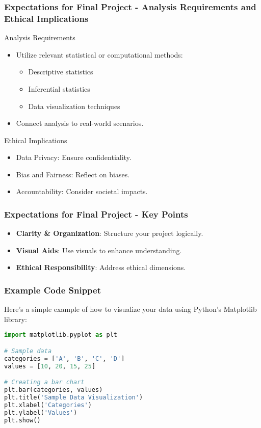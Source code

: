 \documentclass[aspectratio=169]{beamer}
\begin{document}
\begin{frame}[fragile]
    \frametitle{Expectations for Final Project - Analysis Requirements and Ethical Implications}
    \begin{block}{Analysis Requirements}
        \begin{itemize}
            \item Utilize relevant statistical or computational methods:
            \begin{itemize}
                \item Descriptive statistics
                \item Inferential statistics
                \item Data visualization techniques
            \end{itemize}
            \item Connect analysis to real-world scenarios.
        \end{itemize}
    \end{block}
    
    \begin{block}{Ethical Implications}
        \begin{itemize}
            \item Data Privacy: Ensure confidentiality.
            \item Bias and Fairness: Reflect on biases.
            \item Accountability: Consider societal impacts.
        \end{itemize}
    \end{block}
\end{frame}

\begin{frame}[fragile]
    \frametitle{Expectations for Final Project - Key Points}
    \begin{itemize}
        \item \textbf{Clarity \& Organization}: Structure your project logically.
        \item \textbf{Visual Aids}: Use visuals to enhance understanding.
        \item \textbf{Ethical Responsibility}: Address ethical dimensions.
    \end{itemize}
\end{frame}

\begin{frame}[fragile]
    \frametitle{Example Code Snippet}
    Here's a simple example of how to visualize your data using Python's Matplotlib library:
    
    \begin{lstlisting}[language=Python]
import matplotlib.pyplot as plt

# Sample data
categories = ['A', 'B', 'C', 'D']
values = [10, 20, 15, 25]

# Creating a bar chart
plt.bar(categories, values)
plt.title('Sample Data Visualization')
plt.xlabel('Categories')
plt.ylabel('Values')
plt.show()
    \end{lstlisting}
\end{frame}
\end{document}
